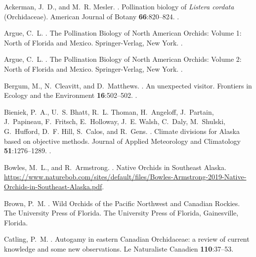 \begin{multicols}{2}
\begin{thebibliography}{27}
Ackerman, J.~D., and M.~R. Mesler.
.
\newblock Pollination biology of \emph{Listera cordata} (Orchidaceae).
\newblock American Journal of Botany {\bfseries 66}:820--824.
\newblock {}.

Argue, C.~L.
.
\newblock The Pollination Biology of North American Orchids: Volume 1: North of
  Florida and Mexico.
\newblock Springer-Verlag, New York.
\newblock {}.

Argue, C.~L.
.
\newblock The Pollination Biology of North American Orchids: Volume 2: North of
  Florida and Mexico.
\newblock Springer-Verlag, New York.
\newblock {}.

Bergum, M., N.~Cleavitt, and D.~Matthews.
.
\newblock An unexpected visitor.
\newblock Frontiers in Ecology and the Environment {\bfseries 16}:502--502.
\newblock {}.

Bieniek, P.~A., U.~S. Bhatt, R.~L. Thoman, H.~Angeloff, J.~Partain,
  J.~Papineau, F.~Fritsch, E.~Holloway, J.~E. Walsh, C.~Daly, M.~Shulski,
  G.~Hufford, D.~F. Hill, S.~Calos, and R.~Gens.
.
\newblock Climate divisions for Alaska based on objective methods.
\newblock Journal of Applied Meteorology and Climatology {\bfseries
  51}:1276--1289.
\newblock {}.

Bowles, M.~L., and R.~Armstrong.
.
\newblock Native Orchids in Southeast Alaska.
\newblock
  \urlprefix\url{https://www.naturebob.com/sites/default/files/Bowles-Armstrong-2019-Native-Orchids-in-Southeast-Alaska.pdf}.

Brown, P.~M.
.
\newblock Wild Orchids of the Pacific Northwest and Canadian Rockies. The
  University Press of Florida.
\newblock The University Press of Florida, Gainesville, Florida.

Catling, P.~M.
.
\newblock Autogamy in eastern Canadian Orchidaceae: a review of current
  knowledge and some new observations.
\newblock Le Naturaliste Canadien {\bfseries 110}:37--53.


\end{thebibliography}
\end{multicols}
